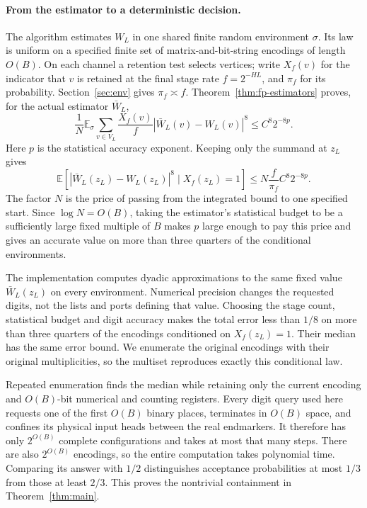 \paragraph{From the estimator to a deterministic decision.}
The algorithm estimates $W_L$ in one shared finite random environment
$\sigma$.  Its law is uniform on a specified finite set of matrix-and-bit-string
encodings of length $O(B)$.  On each channel a retention test
selects vertices; write $X_f(v)$ for the indicator that $v$ is retained
at the final stage rate $f=2^{-HL}$, and $\pi_f$ for its probability.
Section~\ref{sec:env} gives $\pi_f\asymp f$.
Theorem~\ref{thm:fp-estimators} proves, for the actual estimator $\bar W_L$,
\[
 \frac1N\mathbb E_\sigma\sum_{v\in V_L}\frac{X_f(v)}f
          |\bar W_L(v)-W_L(v)|^8\le C^8 2^{-8p}.
\]
Here $p$ is the statistical accuracy exponent.
Keeping only the summand at $z_L$ gives
\[
 \mathbb E\!\left[|\bar W_L(z_L)-W_L(z_L)|^8
                     \mid X_f(z_L)=1\right]
       \le N\frac f{\pi_f}C^8 2^{-8p}.
\]
The factor $N$ is the price of passing from the integrated bound to one
specified start.  Since $\log N=O(B)$, taking the estimator's statistical
budget to be a sufficiently large fixed multiple of $B$ makes $p$ large
enough to pay this price and gives an
accurate value on more than three quarters of the conditional
environments.

The implementation computes dyadic approximations to the same fixed
value $\bar W_L(z_L)$ on every environment.  Numerical precision
changes the requested digits, not the lists and ports defining that
value.  Choosing the stage count, statistical budget and digit accuracy
makes the total error less than $1/8$ on more than three quarters of
the encodings conditioned on $X_f(z_L)=1$.  Their median has the same
error bound.  We enumerate the original encodings with their original
multiplicities, so the multiset reproduces exactly this conditional law.

Repeated enumeration finds the median while retaining only the current
encoding and $O(B)$-bit numerical and counting registers.  Every digit
query used here requests one of the first $O(B)$ binary places,
terminates in $O(B)$ space, and confines
its physical input heads between the real endmarkers.  It therefore has only
$2^{O(B)}$ complete configurations and takes at most that many steps.
There are also $2^{O(B)}$ encodings, so the entire computation takes
polynomial time.  Comparing its answer with $1/2$ distinguishes
acceptance probabilities at most $1/3$ from those at least $2/3$.
This proves the nontrivial containment in Theorem~\ref{thm:main}.

